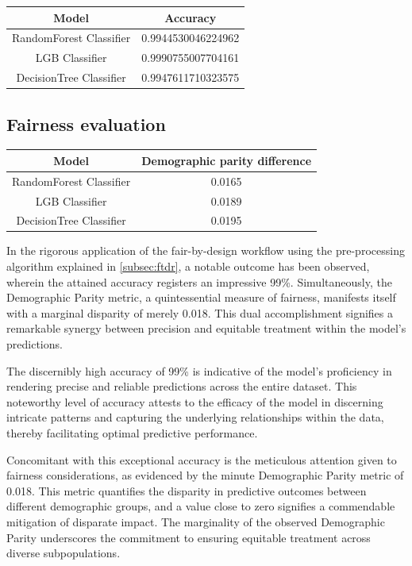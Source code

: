 \documentclass[12pt,a4paper,openright,twoside]{book}
\begin{document}
\begin{tabular}{|c|c|}
    \hline
    \textbf{Model} & \textbf{Accuracy} \\ 
    \hline
    RandomForest Classifier  &  0.9944530046224962 \\
    \hline
    LGB Classifier & 0.9990755007704161 \\
    \hline
    DecisionTree Classifier & 0.9947611710323575 \\ 
    \hline
\end{tabular}

\subsection{Fairness evaluation}

\begin{tabular}{|c|c|}
    \hline
    \textbf{Model} & \textbf{Demographic parity difference} \\
    \hline
    RandomForest Classifier & 0.0165 \\
    \hline
    LGB Classifier & 0.0189 \\
    \hline
    DecisionTree Classifier & 0.0195 \\
    \hline
\end{tabular}


In the rigorous application of the fair-by-design workflow using the pre-processing algorithm explained in \cref{subsec:ftdr}, a notable outcome has been observed, wherein the attained accuracy registers an impressive 99\%. Simultaneously, the Demographic Parity metric, a quintessential measure of fairness, manifests itself with a marginal disparity of merely 0.018. This dual accomplishment signifies a remarkable synergy between precision and equitable treatment within the model's predictions.

The discernibly high accuracy of 99\% is indicative of the model's proficiency in rendering precise and reliable predictions across the entire dataset. This noteworthy level of accuracy attests to the efficacy of the model in discerning intricate patterns and capturing the underlying relationships within the data, thereby facilitating optimal predictive performance.

Concomitant with this exceptional accuracy is the meticulous attention given to fairness considerations, as evidenced by the minute Demographic Parity metric of 0.018. This metric quantifies the disparity in predictive outcomes between different demographic groups, and a value close to zero signifies a commendable mitigation of disparate impact. The marginality of the observed Demographic Parity underscores the commitment to ensuring equitable treatment across diverse subpopulations.
\end{document}
